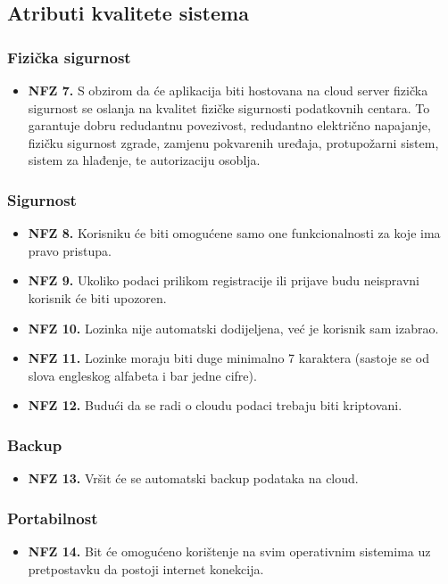 \subsection{Atributi kvalitete sistema}
\subsubsection{Fizička sigurnost}
    \begin{itemize}
        \item \textbf{NFZ 7.} S obzirom da će aplikacija biti hostovana na cloud server fizička sigurnost se oslanja na kvalitet fizičke sigurnosti podatkovnih centara. To garantuje dobru redudantnu povezivost, redudantno električno napajanje, fizičku sigurnost zgrade, zamjenu pokvarenih uređaja, protupožarni sistem, sistem za hlađenje, te autorizaciju osoblja.
    \end{itemize}
\subsubsection{Sigurnost}
    \begin{itemize}
        \item \textbf{NFZ 8.} Korisniku će biti omogućene samo one funkcionalnosti za koje ima pravo pristupa.
        \item \textbf{NFZ 9.} Ukoliko podaci prilikom registracije ili prijave budu neispravni korisnik će biti upozoren.
        \item \textbf{NFZ 10.} Lozinka nije automatski dodijeljena, već je korisnik sam izabrao.
        \item \textbf{NFZ 11.} Lozinke moraju biti duge minimalno 7 karaktera (sastoje se od slova engleskog alfabeta i bar jedne cifre).
        \item \textbf{NFZ 12.} Budući da se radi o cloudu podaci trebaju biti kriptovani.
    \end{itemize}
\subsubsection{Backup}
\begin{itemize}
    \item \textbf{NFZ 13.} Vršit će se automatski backup podataka na cloud.
\end{itemize}
\subsubsection{Portabilnost}
\begin{itemize}
    \item \textbf{NFZ 14.} Bit će omogućeno korištenje na svim operativnim sistemima uz pretpostavku da postoji internet konekcija. 
\end{itemize}
